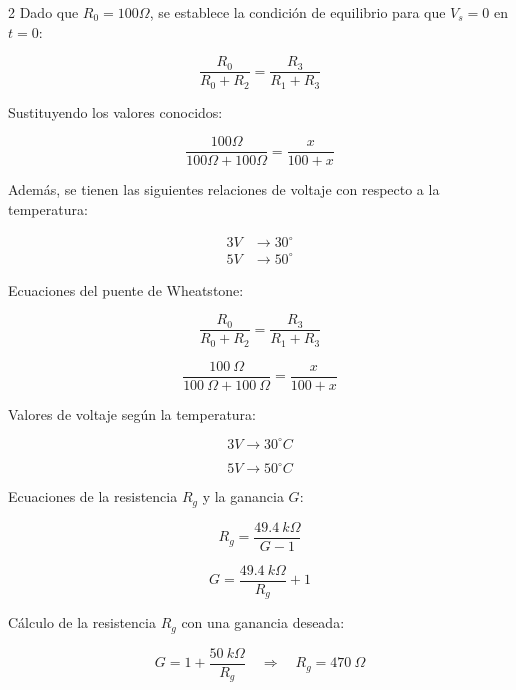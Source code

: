 \documentclass{article}
\begin{document}
\begin{multicols}{2}
Dado que $R_0 = 100\Omega$, se establece la condición de equilibrio para que $V_s = 0$ en $t=0$:

\begin{equation}
    \frac{R_0}{R_0 + R_2} = \frac{R_3}{R_1 + R_3}
\end{equation}

Sustituyendo los valores conocidos:

\begin{equation}
    \frac{100\Omega}{100\Omega + 100\Omega} = \frac{x}{100 + x}
\end{equation}

Además, se tienen las siguientes relaciones de voltaje con respecto a la temperatura:

\begin{align}
    3V &\rightarrow 30^\circ \\
    5V &\rightarrow 50^\circ
\end{align}



Ecuaciones del puente de Wheatstone:

\begin{equation}
\frac{R_0}{R_0 + R_2} = \frac{R_3}{R_1 + R_3}
\end{equation}

\begin{equation}
\frac{100\ \Omega}{100\ \Omega + 100\ \Omega} = \frac{x}{100 + x}
\end{equation}

Valores de voltaje según la temperatura:

\begin{equation}
3V \rightarrow 30^\circ C
\end{equation}

\begin{equation}
5V \rightarrow 50^\circ C
\end{equation}

Ecuaciones de la resistencia \( R_g \) y la ganancia \( G \):

\begin{equation}
R_g = \frac{49.4\ k\Omega}{G - 1}
\end{equation}

\begin{equation}
G = \frac{49.4\ k\Omega}{R_g} + 1
\end{equation}

Cálculo de la resistencia \( R_g \) con una ganancia deseada:

\begin{equation}
G = 1 + \frac{50\ k\Omega}{R_g} \quad \Rightarrow \quad R_g = 470\ \Omega
\end{equation}


\end{multicols}
\end{document}
